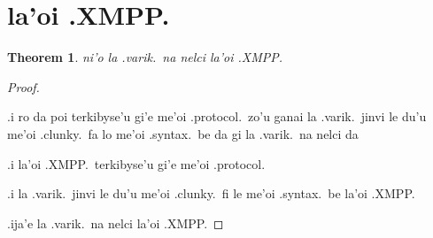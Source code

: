 \documentclass{article}
\newtheorem{thm}{Theorem}
\begin{document}
\section{la'oi .XMPP.}
\begin{thm}
	ni'o la .varik.\ na nelci la'oi .XMPP.
\end{thm}
\begin{proof}
	${}$

	.i ro da poi terkibyse'u gi'e me'oi .protocol.\ zo'u ganai la .varik.\ jinvi le du'u me'oi .clunky.\ fa lo me'oi .syntax.\ be da gi la .varik.\ na nelci da

	.i la'oi .XMPP.\ terkibyse'u gi'e me'oi .protocol.

	.i la .varik.\ jinvi le du'u me'oi .clunky.\ fi le me'oi .syntax.\ be la'oi .XMPP.

	.ija'e la .varik.\ na nelci la'oi .XMPP.
\end{proof}
\end{document}
